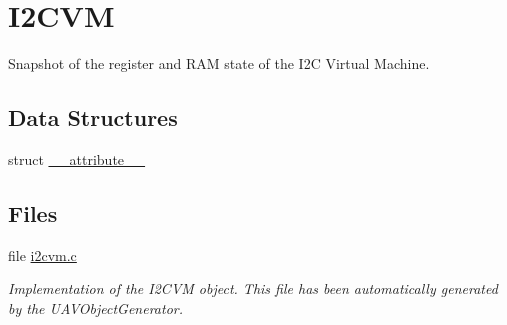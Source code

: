 \hypertarget{group___i2_c_v_m}{\section{\-I2\-C\-V\-M}
\label{group___i2_c_v_m}
}


\-Snapshot of the register and \-R\-A\-M state of the \-I2\-C \-Virtual \-Machine.  


\subsection*{\-Data \-Structures}
\begin{DoxyCompactItemize}
\item 
struct \hyperlink{struct____attribute____}{\-\_\-\-\_\-attribute\-\_\-\-\_\-}
\end{DoxyCompactItemize}
\subsection*{\-Files}
\begin{DoxyCompactItemize}
\item 
file \hyperlink{i2cvm_8c}{i2cvm.\-c}
\begin{DoxyCompactList}\small\item\em \-Implementation of the \-I2\-C\-V\-M object. \-This file has been automatically generated by the \-U\-A\-V\-Object\-Generator. \end{DoxyCompactList}\end{DoxyCompactItemize}
